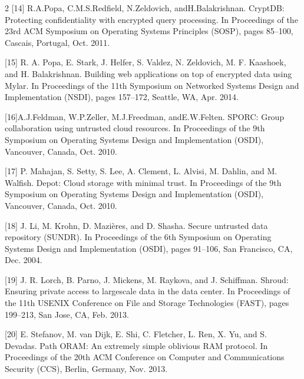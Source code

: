 \documentclass[12pt,a4paper]{article}
\begin{document}
\begin{multicols}{2}
[14] R.A.Popa, C.M.S.Redfield, N.Zeldovich, andH.Balakrishnan. CryptDB: Protecting confidentiality with encrypted query processing. In Proceedings of the 23rd ACM Symposium on Operating Systems Principles (SOSP), pages 85–100, Cascais, Portugal, Oct. 2011.

[15] R. A. Popa, E. Stark, J. Helfer, S. Valdez, N. Zeldovich, M. F. Kaashoek, and H. Balakrishnan. Building web applications on top of encrypted data using Mylar. In Proceedings of the 11th Symposium on Networked Systems Design and Implementation (NSDI), pages 157–172, Seattle, WA, Apr. 2014.

[16]A.J.Feldman, W.P.Zeller, M.J.Freedman, andE.W.Felten. SPORC: Group collaboration using untrusted cloud resources. In Proceedings of the 9th Symposium on Operating Systems Design and Implementation (OSDI), Vancouver, Canada, Oct. 2010.

[17] P. Mahajan, S. Setty, S. Lee, A. Clement, L. Alvisi, M. Dahlin, and M. Walfish. Depot: Cloud storage with minimal trust. In Proceedings of the 9th Symposium on Operating Systems Design and Implementation (OSDI), Vancouver, Canada, Oct. 2010.

[18] J. Li, M. Krohn, D. Mazières, and D. Shasha. Secure untrusted data repository (SUNDR). In Proceedings of the 6th Symposium on Operating Systems Design and Implementation (OSDI), pages 91–106, San Francisco, CA, Dec. 2004.

[19] J. R. Lorch, B. Parno, J. Mickens, M. Raykova, and J. Schiffman. Shroud: Ensuring private access to largescale data in the data center. In Proceedings of the 11th USENIX Conference on File and Storage Technologies (FAST), pages 199–213, San Jose, CA, Feb. 2013.

[20] E. Stefanov, M. van Dijk, E. Shi, C. Fletcher, L. Ren, X. Yu, and S. Devadas. Path ORAM: An extremely simple oblivious RAM protocol. In Proceedings of the 20th ACM Conference on Computer and Communications Security (CCS), Berlin, Germany, Nov. 2013.
\end{multicols}
\end{document}
